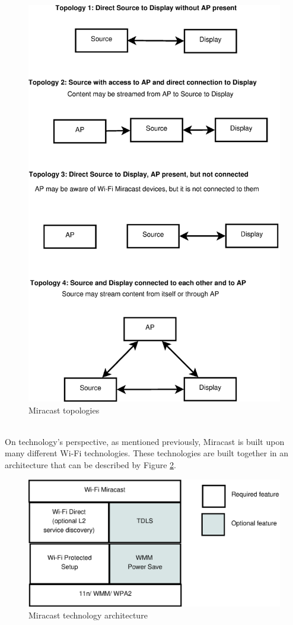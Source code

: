 \begin{figure}[htb] \centering 
\hspace*{2cm} \includegraphics[width=0.9\columnwidth]{charts/miracast_model} 
\caption{Miracast topologies \label{miracast_model}} 
\end{figure} 
\\
On technology's perspective, as mentioned previously, Miracast is built upon
many different Wi-Fi technologies. These technologies are built together in an
architecture that can be described by Figure \ref{miracast_architect}. \\
\begin{figure}[htb] \centering 
\includegraphics[width=0.9\columnwidth]{charts/miracast_technology_architecture} 
\caption{Miracast technology architecture \label{miracast_architect}} 
\end{figure} 
